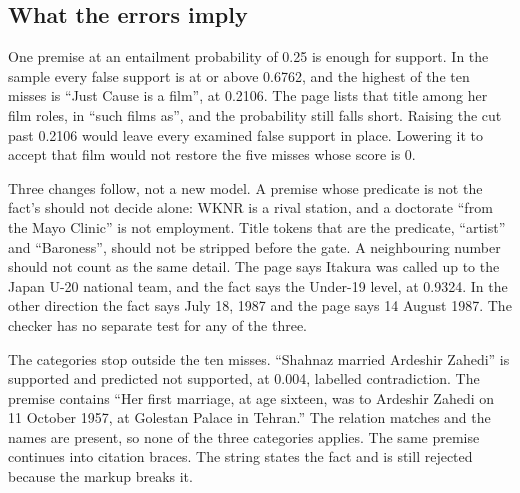 \subsection{What the errors imply}

One premise at an entailment probability of 0.25 is enough for support. In the sample every false support is at or above 0.6762, and the highest of the ten misses is ``Just Cause is a film'', at 0.2106. The page lists that title among her film roles, in ``such films as'', and the probability still falls short. Raising the cut past 0.2106 would leave every examined false support in place. Lowering it to accept that film would not restore the five misses whose score is 0.

Three changes follow, not a new model. A premise whose predicate is not the fact's should not decide alone: WKNR is a rival station, and a doctorate ``from the Mayo Clinic'' is not employment. Title tokens that are the predicate, ``artist'' and ``Baroness'', should not be stripped before the gate. A neighbouring number should not count as the same detail. The page says Itakura was called up to the Japan U-20 national team, and the fact says the Under-19 level, at 0.9324. In the other direction the fact says July 18, 1987 and the page says 14 August 1987. The checker has no separate test for any of the three.

The categories stop outside the ten misses. ``Shahnaz married Ardeshir Zahedi'' is supported and predicted not supported, at 0.004, labelled contradiction. The premise contains ``Her first marriage, at age sixteen, was to Ardeshir Zahedi on 11 October 1957, at Golestan Palace in Tehran.'' The relation matches and the names are present, so none of the three categories applies. The same premise continues into citation braces. The string states the fact and is still rejected because the markup breaks it.

